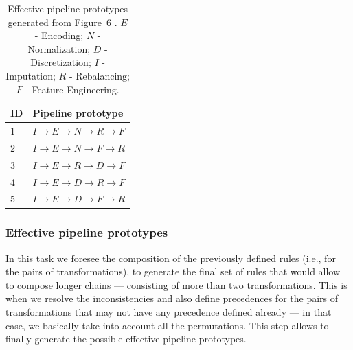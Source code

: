 \begin{example}
\begin{table}[t]
	\caption{Effective pipeline prototypes generated from Figure~6%
	. $E$ - Encoding; $N$ - Normalization; $D$ - Discretization; $I$ - Imputation; $R$ - Rebalancing; $F$ - Feature Engineering.
	}
	\footnotesize
	\label{tbl:effective-pipelines}
	\begin{center}
		\begin{tabular}{@{}ll}
			\toprule
			ID& Pipeline prototype                                             \\ \toprule
			1&{\color[HTML]{000000} $I\rightarrow E\rightarrow N \rightarrow R\rightarrow F$} \\
			2&{\color[HTML]{000000} $I\rightarrow E\rightarrow N \rightarrow F\rightarrow R$} \\
			3&{\color[HTML]{000000} $I\rightarrow E\rightarrow R \rightarrow D\rightarrow F$} \\
			4&{\color[HTML]{000000} $I\rightarrow E\rightarrow D \rightarrow R\rightarrow F$} \\
			5&{\color[HTML]{000000} $I\rightarrow E\rightarrow D \rightarrow F\rightarrow R$} \\
			\bottomrule
		\end{tabular}
	\end{center}
\end{table}
\fi

\end{example}
\subsubsection{Effective pipeline prototypes}
\label{ssec:composition}
In this task we foresee the composition of the previously defined rules (i.e., for the pairs of transformations), to generate the final set of rules that would allow to compose longer chains --- consisting of more than two transformations. This is when we resolve the inconsistencies and also define precedences for the pairs of transformations that may not have any precedence defined already --- in that case, we basically take into account all the permutations. This step allows to finally generate the possible effective pipeline prototypes. 

